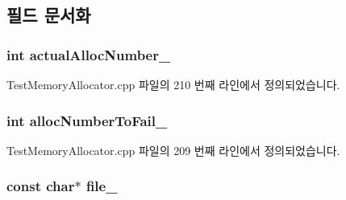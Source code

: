 \subsection{필드 문서화}
\subsubsection[{\texorpdfstring{actual\+Alloc\+Number\+\_\+}{actualAllocNumber_}}]{\setlength{\rightskip}{0pt plus 5cm}int actual\+Alloc\+Number\+\_\+}\hypertarget{class_location_to_fail_alloc_node_adaf74e319a99b1e58c27cb006936108a}{}\label{class_location_to_fail_alloc_node_adaf74e319a99b1e58c27cb006936108a}


Test\+Memory\+Allocator.\+cpp 파일의 210 번째 라인에서 정의되었습니다.

\subsubsection[{\texorpdfstring{alloc\+Number\+To\+Fail\+\_\+}{allocNumberToFail_}}]{\setlength{\rightskip}{0pt plus 5cm}int alloc\+Number\+To\+Fail\+\_\+}\hypertarget{class_location_to_fail_alloc_node_af455eff2e2a9cca9706893914495d60c}{}\label{class_location_to_fail_alloc_node_af455eff2e2a9cca9706893914495d60c}


Test\+Memory\+Allocator.\+cpp 파일의 209 번째 라인에서 정의되었습니다.

\subsubsection[{\texorpdfstring{file\+\_\+}{file_}}]{\setlength{\rightskip}{0pt plus 5cm}const char$\ast$ file\+\_\+}\hypertarget{class_location_to_fail_alloc_node_a1f340748cdde8f8781fa62b4a3562190}{}\label{class_location_to_fail_alloc_node_a1f340748cdde8f8781fa62b4a3562190}


